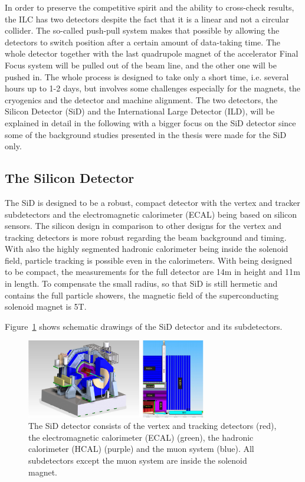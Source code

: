 In order to preserve the competitive spirit and the ability to cross-check results, the ILC has two detectors despite the fact that it is a linear and not a circular collider.
The so-called push-pull system makes that possible by allowing the detectors to switch position after a certain amount of data-taking time.
The whole detector together with the last quadrupole magnet of the accelerator Final Focus system will be pulled out of the beam line, and the other one will be pushed in.
The whole process is designed to take only a short time, i.e. several hours up to 1-2 days, but involves some challenges especially for the magnets, the cryogenics and the detector and machine alignment.\cite[p. 28-29]{TDR1}
The two detectors, the Silicon Detector (SiD) and the International Large Detector (ILD), will be explained in detail in the following with a bigger focus on the SiD detector since some of the background studies presented in the thesis were made for the SiD only.

\subsection{The Silicon Detector}
The SiD is designed to be a robust, compact detector with the vertex and tracker subdetectors and the electromagnetic calorimeter (ECAL) being based on silicon sensors.
The silicon design in comparison to other designs for the vertex and tracking detectors is more robust regarding the beam background and timing.
With also the highly segmented hadronic calorimeter being inside the solenoid field, particle tracking is possible even in the calorimeters.
With being designed to be compact, the measurements for the full detector are \unit{14}{m} in height and \unit{11}{m} in length.
To compensate the small radius, so that SiD is still hermetic and contains the full particle showers, the magnetic field of the superconducting solenoid magnet is \unit{5}{T}.

Figure~\ref{fig:SiD} shows schematic drawings of the SiD detector and its subdetectors.

\begin{figure}
\centering
\includegraphics[width=0.7\textwidth]{Figures/SiD.png}
\caption[Schematic drawing of the SiD detector]{The SiD detector consists of the vertex and tracking detectors (red), the electromagnetic calorimeter (ECAL) (green), the hadronic calorimeter (HCAL) (purple) and the muon system (blue). All subdetectors except the muon system are inside the solenoid magnet.\cite[p. 31]{TDR1}}
\label{fig:SiD}
\end{figure}

